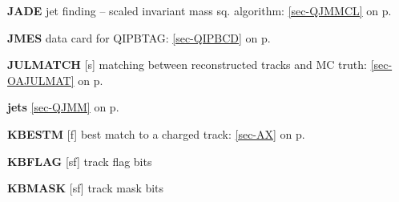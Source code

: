  
 \item{\bf JADE  }jet finding -- scaled invariant mass sq. algorithm:
 \ref{sec-QJMMCL} on p.~\pageref{sec-QJMMCL}\\
 \item{\bf JMES    }data card for QIPBTAG:  \ref{sec-QIPBCD} on p.~\pageref{sec-QIPBCD}\\
 \item{\bf JULMATCH }[s] matching between reconstructed tracks and MC truth:
 \ref{sec-OAJULMAT} on p.~\pageref{sec-OAJULMAT}\\
 \item{\bf jets }\ref{sec-QJMM} on p.~\pageref{sec-QJMM}
 
 \item{\bf KBESTM  }[f] best match to a charged track: \ref{sec-AX} on p.~\pageref{sec-AX}\\
 \item{\bf KBFLAG  }[sf] track flag bits\\
 \item{\bf KBMASK  }[sf] track mask bits
 
